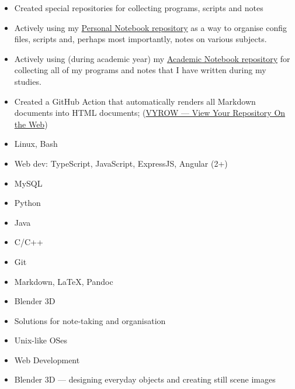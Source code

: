 \documentclass[10pt,a4paper,ragged2e,withhyper]{altacv}
\begin{document}
\begin{paracol}{2}
\begin{itemize}
\item Created special repositories for collecting programs, scripts and notes
\item Actively using my \href{https://personal.jerry-sky.me}{Personal Notebook repository} as a way to organise config files, scripts and, perhaps most importantly, notes on various subjects.
\item Actively using (during academic year) my \href{https://academic.jerry-sky.me}{Academic Notebook repository} for collecting all of my programs and notes that I have written during my studies.
\item Created a GitHub Action that automatically renders all Markdown documents into HTML documents; (\href{https://github.com/marketplace/actions/vyrow}{VYROW — View Your Repository On the Web})
\end{itemize}

\divider

\switchcolumn



\begin{itemize}
\item Linux, Bash
\item Web dev: TypeScript, JavaScript, ExpressJS, Angular (2+)
\item MySQL
\item Python
\item Java
\item C/C++
\item Git
\item Markdown, LaTeX, Pandoc
\item Blender 3D
\end{itemize}


\begin{itemize}
  \item Solutions for note-taking and organisation
  \item Unix-like OSes
  \item Web Development
  \item Blender 3D — designing everyday objects and creating still scene images
\end{itemize}


\end{paracol}
\end{document}
